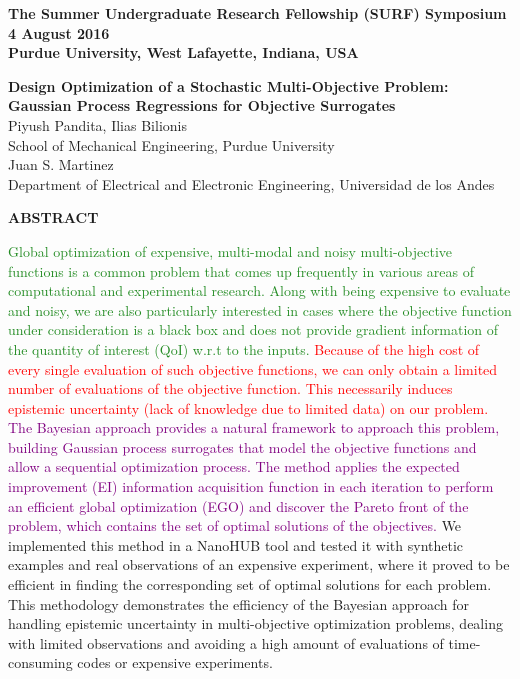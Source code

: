 \documentclass[a4paper]{article}
\begin{document}
{\footnotesize
  \textbf{The Summer Undergraduate Research Fellowship (SURF) Symposium\\
    4 August 2016\\
    Purdue University, West Lafayette, Indiana, USA\\
    }
}
\begin{center}
{\Large \textbf{Design Optimization of a Stochastic Multi-Objective Problem: Gaussian Process Regressions for Objective Surrogates\\}}
{\normalsize Piyush Pandita, Ilias Bilionis\\
School of Mechanical Engineering, Purdue University\\
Juan S. Martinez\\
Department of Electrical and Electronic Engineering, Universidad de los Andes\\
}
\end{center}
{\large \textbf{ABSTRACT}\\}

{\normalsize \textcolor{ForestGreen}{Global optimization of expensive, multi-modal and noisy multi-objective functions is a common problem that comes up frequently in various areas of computational and experimental research. Along with being expensive to evaluate and noisy, we are also particularly interested in cases where the objective function under consideration is a black box and does not provide gradient information of the quantity of interest (QoI) w.r.t to the inputs. }\textcolor{red}{Because of the high cost of every single evaluation of such objective functions, we can only obtain a limited number of evaluations of the objective function. This necessarily induces epistemic uncertainty (lack of knowledge due to limited data) on our problem. }\textcolor{Purple}{The Bayesian approach provides a natural framework to approach this problem, building Gaussian process  surrogates that model the objective functions and allow a sequential optimization process. The method applies the expected improvement (EI) information acquisition function in each iteration to perform an efficient global optimization (EGO) and discover the Pareto front of the problem, which contains the set of optimal solutions of the objectives. }\textcolor{TealBlue}{We implemented this method in a NanoHUB tool and tested it with synthetic examples and real observations of an expensive experiment, where it proved to be efficient in finding the corresponding set of optimal solutions for each problem. }This methodology demonstrates the efficiency of the Bayesian approach for handling epistemic uncertainty in multi-objective optimization problems, dealing with limited observations and avoiding a high amount of evaluations of time-consuming codes or expensive experiments.\\}
\end{document}
